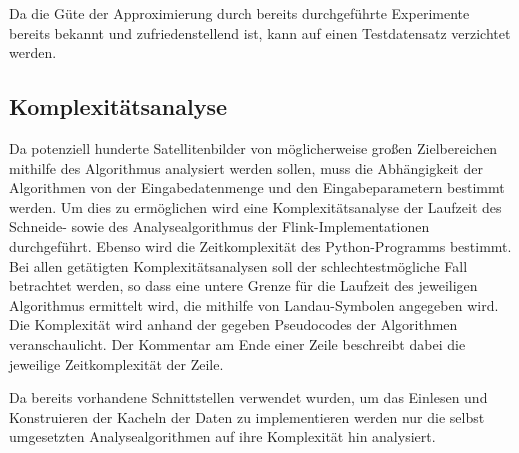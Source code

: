 Da die Güte der Approximierung durch bereits durchgeführte Experimente bereits bekannt und zufriedenstellend ist, kann auf einen Testdatensatz verzichtet werden.

\subsection{Komplexitätsanalyse}
\label{sec:ComplexityAnalysis}
Da potenziell hunderte Satellitenbilder von möglicherweise großen Zielbereichen mithilfe des Algorithmus analysiert werden sollen, muss die Abhängigkeit der Algorithmen von der Eingabedatenmenge und den Eingabeparametern bestimmt werden. Um dies zu ermöglichen wird eine Komplexitätsanalyse der Laufzeit des Schneide- sowie des Analysealgorithmus der Flink-Implementationen durchgeführt. Ebenso wird die Zeitkomplexität des Python-Programms bestimmt. Bei allen getätigten Komplexitätsanalysen soll der schlechtestmögliche Fall betrachtet werden, so dass eine untere Grenze für die Laufzeit des jeweiligen Algorithmus ermittelt wird, die mithilfe von Landau-Symbolen angegeben wird. Die Komplexität wird anhand der gegeben Pseudocodes der Algorithmen veranschaulicht. Der Kommentar am Ende einer Zeile beschreibt dabei die jeweilige Zeitkomplexität der Zeile. 

Da bereits vorhandene Schnittstellen verwendet wurden, um das Einlesen und Konstruieren der Kacheln der Daten zu implementieren werden nur die selbst umgesetzten Analysealgorithmen auf ihre Komplexität hin analysiert.

